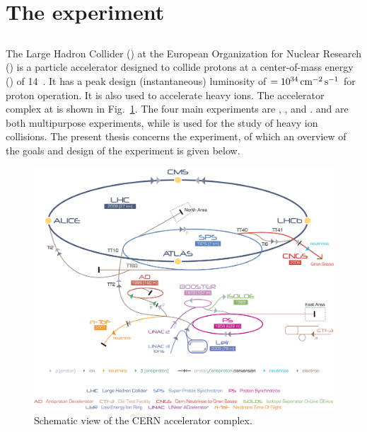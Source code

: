 \section{The \lhcb experiment}
\label{sec:lhcb}


\subsection{\lhc}
\label{sec:lhcb:lhc}

The Large Hadron Collider (\lhc) at the European Organization for Nuclear Research (\cern) is a particle accelerator designed to collide protons at a center-of-mass energy (\sqs) of 14\tev~\cite{lhc}. It has a peak design (instantaneous) luminosity of \lum$= 10^{34}\mathrm{ \,cm}^{-2}\mathrm{{\,s}}^{-1}$ for proton operation. It is also used to accelerate heavy ions. The accelerator complex at \cern is shown in Fig.~\ref{fig:lhc}. The four main experiments are \atlas, \cms, \lhcb and \alice. \atlas and \cms are both multipurpose experiments, while \alice is used for the study of heavy ion collisions. The present thesis concerns the \lhcb experiment, of which an overview of the goals and design of the experiment is given below.

\begin{figure}[!b]
\centering
\includegraphics[width=\textwidth]{figs/detector/lhc.jpg}
\caption{Schematic view of the CERN accelerator complex.}
\label{fig:lhc}
\end{figure}

